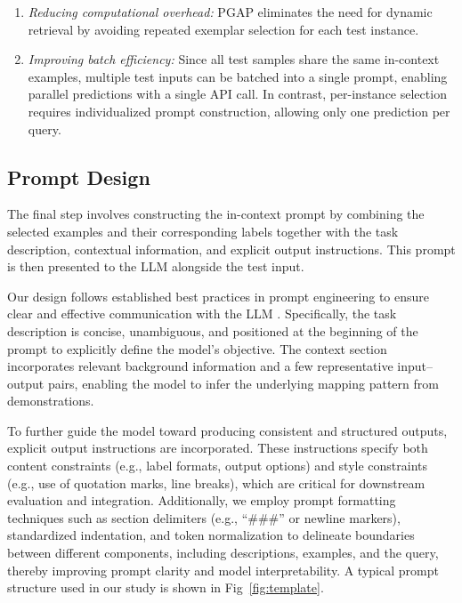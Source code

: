 \documentclass[journal,twocolumn]{IEEEtran}
\begin{document}
\begin{enumerate}
  \item \emph{Reducing computational overhead:} PGAP eliminates the need for dynamic retrieval by avoiding repeated exemplar selection for each test instance.
  \item \emph{Improving batch efficiency:} Since all test samples share the same in-context examples, multiple test inputs can be batched into a single prompt, enabling parallel predictions with a single API call. In contrast, per-instance selection requires individualized prompt construction, allowing only one prediction per query.
\end{enumerate}

\subsection{Prompt Design}

The final step involves constructing the in-context prompt by combining the selected examples and their corresponding labels together with the task description, contextual information, and explicit output instructions. This prompt is then presented to the LLM alongside the test input.

Our design follows established best practices in prompt engineering to ensure clear and effective communication with the LLM \cite{chen2023unleashing}. Specifically, the task description is concise, unambiguous, and positioned at the beginning of the prompt to explicitly define the model's objective. The context section incorporates relevant background information and a few representative input–output pairs, enabling the model to infer the underlying mapping pattern from demonstrations.

To further guide the model toward producing consistent and structured outputs, explicit output instructions are incorporated. These instructions specify both content constraints (e.g., label formats, output options) and style constraints (e.g., use of quotation marks, line breaks), which are critical for downstream evaluation and integration. Additionally, we employ prompt formatting techniques such as section delimiters (e.g., “\#\#\#” or newline markers), standardized indentation, and token normalization to delineate boundaries between different components, including descriptions, examples, and the query, thereby improving prompt clarity and model interpretability. A typical prompt structure used in our study is shown in Fig~\ref{fig:template}.
\end{document}
